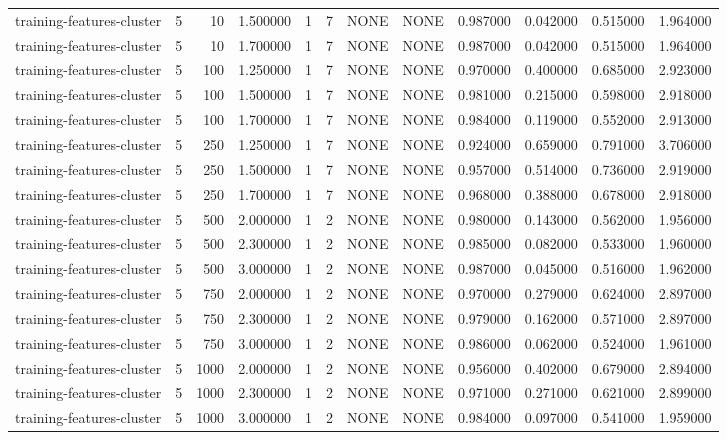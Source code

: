 \begin{tabular}{lrrrllllrrrr}
training-features-cluster & 5 & 10 & 1.500000 & 1 & 7 & NONE & NONE & 0.987000 & 0.042000 & 0.515000 & 1.964000 \\
training-features-cluster & 5 & 10 & 1.700000 & 1 & 7 & NONE & NONE & 0.987000 & 0.042000 & 0.515000 & 1.964000 \\
training-features-cluster & 5 & 100 & 1.250000 & 1 & 7 & NONE & NONE & 0.970000 & 0.400000 & 0.685000 & 2.923000 \\
training-features-cluster & 5 & 100 & 1.500000 & 1 & 7 & NONE & NONE & 0.981000 & 0.215000 & 0.598000 & 2.918000 \\
training-features-cluster & 5 & 100 & 1.700000 & 1 & 7 & NONE & NONE & 0.984000 & 0.119000 & 0.552000 & 2.913000 \\
training-features-cluster & 5 & 250 & 1.250000 & 1 & 7 & NONE & NONE & 0.924000 & 0.659000 & 0.791000 & 3.706000 \\
training-features-cluster & 5 & 250 & 1.500000 & 1 & 7 & NONE & NONE & 0.957000 & 0.514000 & 0.736000 & 2.919000 \\
training-features-cluster & 5 & 250 & 1.700000 & 1 & 7 & NONE & NONE & 0.968000 & 0.388000 & 0.678000 & 2.918000 \\
training-features-cluster & 5 & 500 & 2.000000 & 1 & 2 & NONE & NONE & 0.980000 & 0.143000 & 0.562000 & 1.956000 \\
training-features-cluster & 5 & 500 & 2.300000 & 1 & 2 & NONE & NONE & 0.985000 & 0.082000 & 0.533000 & 1.960000 \\
training-features-cluster & 5 & 500 & 3.000000 & 1 & 2 & NONE & NONE & 0.987000 & 0.045000 & 0.516000 & 1.962000 \\
training-features-cluster & 5 & 750 & 2.000000 & 1 & 2 & NONE & NONE & 0.970000 & 0.279000 & 0.624000 & 2.897000 \\
training-features-cluster & 5 & 750 & 2.300000 & 1 & 2 & NONE & NONE & 0.979000 & 0.162000 & 0.571000 & 2.897000 \\
training-features-cluster & 5 & 750 & 3.000000 & 1 & 2 & NONE & NONE & 0.986000 & 0.062000 & 0.524000 & 1.961000 \\
training-features-cluster & 5 & 1000 & 2.000000 & 1 & 2 & NONE & NONE & 0.956000 & 0.402000 & 0.679000 & 2.894000 \\
training-features-cluster & 5 & 1000 & 2.300000 & 1 & 2 & NONE & NONE & 0.971000 & 0.271000 & 0.621000 & 2.899000 \\
training-features-cluster & 5 & 1000 & 3.000000 & 1 & 2 & NONE & NONE & 0.984000 & 0.097000 & 0.541000 & 1.959000 \\

\end{tabular}
